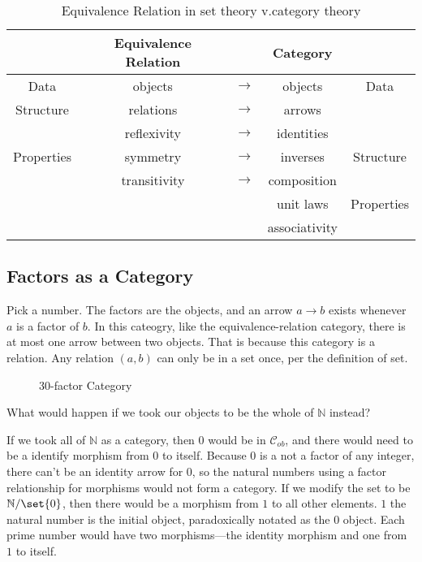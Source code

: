 \begin{table}
	\centering %
	\begin{tabular}{ ccccc } %
		\toprule
		           & Equivalence Relation &               & Category      &            \\ \midrule
		Data       & objects              & $\rightarrow$ & objects       & Data       \\
		Structure  & relations            & $\rightarrow$ & arrows        &            \\ \midrule
		           & reflexivity          & $\rightarrow$ & identities    &            \\
		Properties & symmetry             & $\rightarrow$ & inverses      & Structure  \\
		           & transitivity         & $\rightarrow$ & composition   &            \\\midrule
		           &                      &               & unit laws     & Properties \\
		           &                      &               & associativity &
		\\\bottomrule
	\end{tabular}
	\caption{Equivalence Relation in set theory v.\;category theory}
\end{table}
\subsection{Factors as a Category}
Pick a number. The factors are the objects, and an arrow $a\rightarrow b$ exists
whenever $a$ is a factor of $b$. In this cateogry, like the equivalence-relation
category, there is at most one arrow between two objects. That is because this
category is a relation. Any relation $(a, b)$ can only be in
a set once, per the definition of set.
\begin{figure}[H]
	\begin{center}
		
	\end{center}
	\caption{30-factor Category}
\end{figure}
\begin{ttta}
	What would happen if we took our objects to be the whole of $\mathbb{N}$ instead?
\end{ttta}
If we took all of $\mathbb{N}$ as a category, then $0$ would be in
$\mathcal{C}_{ob}$, and there would need to be a identify morphism from $0$ to
itself. Because $0$ is a not a factor of any integer, there can't be an
identity arrow for $0$, so the natural numbers using a factor relationship for
morphisms would not form a category. If we modify the set to be $\mathbb{N} /
	\set{0}$, then there would be a morphism from $1$ to all other elements. $1$
the natural number is the initial object, paradoxically notated as the $0$
object. Each prime number would have two morphisms---the identity morphism and
one from $1$ to itself.
